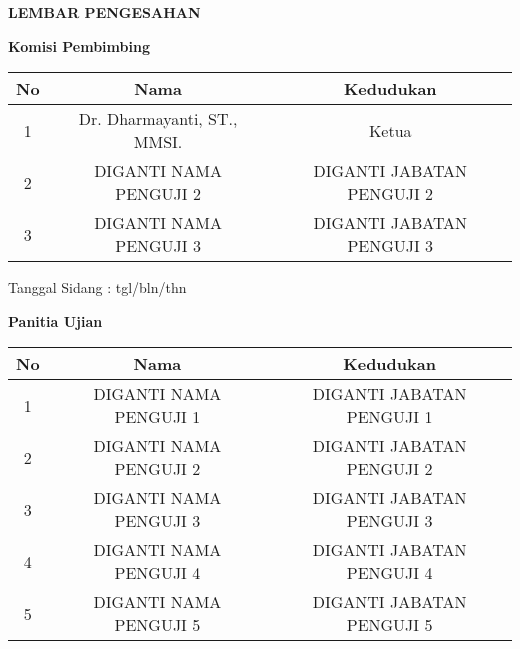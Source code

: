 \newpage
{}
\begin{center}
    {\large \bf \centering LEMBAR PENGESAHAN}

    \vspace{0.75cm}

    {\bf Komisi Pembimbing}

    \vspace{0.5cm}

    \begin{tabular}{|c|c|c|}
        \hline
        No & Nama                        & Kedudukan                 \\
        \hline

        1  & Dr. Dharmayanti, ST., MMSI. & Ketua                     \\
        \hline

        2  & DIGANTI NAMA PENGUJI 2      & DIGANTI JABATAN PENGUJI 2 \\
        \hline
        3  & DIGANTI NAMA PENGUJI 3      & DIGANTI JABATAN PENGUJI 3 \\
        \hline
    \end{tabular}

    \vspace{0.1cm}
    \begin{flushright}
        {Tanggal Sidang : tgl/bln/thn}
    \end{flushright}

    \vspace{0.5cm}

    {\bf Panitia Ujian}

    \vspace{0.5cm}

    \begin{tabular}{|c|c|c|}
        \hline
        No & Nama                   & Kedudukan                 \\
        \hline

        1  & DIGANTI NAMA PENGUJI 1 & DIGANTI JABATAN PENGUJI 1 \\
        \hline

        2  & DIGANTI NAMA PENGUJI 2 & DIGANTI JABATAN PENGUJI 2 \\
        \hline
        3  & DIGANTI NAMA PENGUJI 3 & DIGANTI JABATAN PENGUJI 3 \\
        \hline
        4  & DIGANTI NAMA PENGUJI 4 & DIGANTI JABATAN PENGUJI 4 \\
        \hline
        5  & DIGANTI NAMA PENGUJI 5 & DIGANTI JABATAN PENGUJI 5 \\
        \hline
    \end{tabular}


\end{center}
